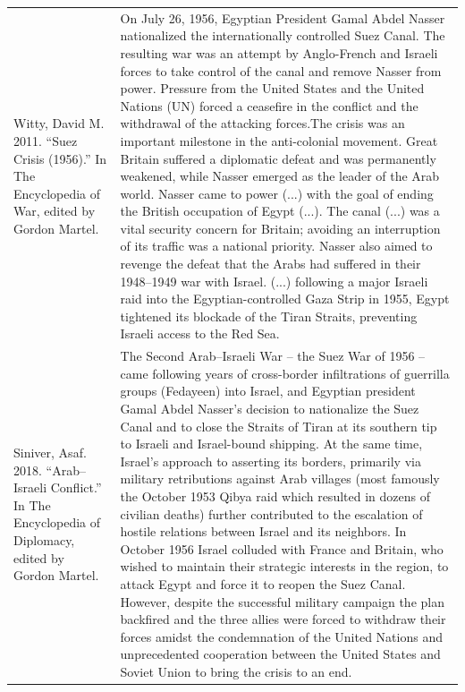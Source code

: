 {\begin{longtable}{p{}p{}}
\\
Witty, David M. 2011. “Suez Crisis (1956).” In The Encyclopedia of War, edited by Gordon Martel. & On July 26, 1956, Egyptian President Gamal Abdel Nasser nationalized the internationally controlled Suez Canal. The resulting war was an attempt by Anglo-French and Israeli forces to take control of the canal and remove Nasser from power. Pressure from the United States and the United Nations (UN) forced a ceasefire in the conflict and the withdrawal of the attacking forces.The crisis was an important milestone in the anti-colonial movement. Great Britain suffered a diplomatic defeat and was permanently weakened, while Nasser emerged as the leader of the Arab world. Nasser came to power (...) with the goal of ending the British occupation of Egypt (...). The canal (...) was a vital security concern for Britain; avoiding an interruption of its traffic was a national priority. Nasser also aimed to revenge the defeat that the Arabs had suffered in their 1948–1949 war with Israel. (...) following a major Israeli raid into the Egyptian-controlled Gaza Strip in 1955, Egypt tightened its blockade of the Tiran Straits, preventing Israeli access to the Red Sea.
\\
Siniver, Asaf. 2018. “Arab–Israeli Conflict.” In The Encyclopedia of Diplomacy, edited by Gordon Martel. & The Second Arab–Israeli War – the Suez War of 1956 – came following years of cross-border infiltrations of guerrilla groups (Fedayeen) into Israel, and Egyptian president Gamal Abdel Nasser's decision to nationalize the Suez Canal and to close the Straits of Tiran at its southern tip to Israeli and Israel-bound shipping. At the same time, Israel's approach to asserting its borders, primarily via military retributions against Arab villages (most famously the October 1953 Qibya raid which resulted in dozens of civilian deaths) further contributed to the escalation of hostile relations between Israel and its neighbors. In October 1956 Israel colluded with France and Britain, who wished to maintain their strategic interests in the region, to attack Egypt and force it to reopen the Suez Canal. However, despite the successful military campaign the plan backfired and the three allies were forced to withdraw their forces amidst the condemnation of the United Nations and unprecedented cooperation between the United States and Soviet Union to bring the crisis to an end. 
\\

\end{longtable}}
